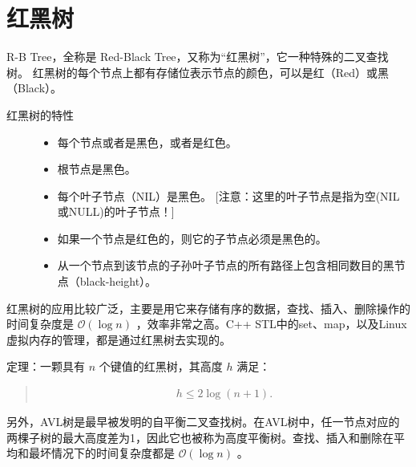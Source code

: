 \documentclass[letterpaper,10pt,english]{sphinxmanual}
\let\sphinxpxdimen\pdfpxdimen\else\newdimen\sphinxpxdimen
\begin{document}
\section{红黑树}
\label{\detokenize{mathematicsAlgorithm/02_redblackTree::doc}}\label{\detokenize{mathematicsAlgorithm/02_redblackTree:id1}}
R-B Tree，全称是 Red-Black Tree，又称为“红黑树”，它一种特殊的二叉查找树。
红黑树的每个节点上都有存储位表示节点的颜色，可以是红（Red）或黑（Black）。
\begin{description}
\item[{红黑树的特性}] \leavevmode\begin{itemize}
\item {} 
每个节点或者是黑色，或者是红色。

\item {} 
根节点是黑色。

\item {} 
每个叶子节点（NIL）是黑色。 {[}注意：这里的叶子节点是指为空(NIL或NULL)的叶子节点！{]}

\item {} 
如果一个节点是红色的，则它的子节点必须是黑色的。

\item {} 
从一个节点到该节点的子孙叶子节点的所有路径上包含相同数目的黑节点（black-height）。

\end{itemize}

\end{description}

\noindent{\hspace*{\fill}\sphinxincludegraphics[width=700\sphinxpxdimen]{{02_rbTree}.jpg}\hspace*{\fill}}

红黑树的应用比较广泛，主要是用它来存储有序的数据，查找、插入、删除操作的时间复杂度是 \(\mathcal{O}(\log n)\) ，效率非常之高。C++ STL中的set、map，以及Linux虚拟内存的管理，都是通过红黑树去实现的。

定理：一颗具有 \(n\) 个键值的红黑树，其高度 \(h\) 满足：
\begin{quote}
\begin{equation*}
\begin{split}h \leqslant 2 \log (n+1).\end{split}
\end{equation*}\end{quote}

另外，AVL树是最早被发明的自平衡二叉查找树。在AVL树中，任一节点对应的两棵子树的最大高度差为1，因此它也被称为高度平衡树。查找、插入和删除在平均和最坏情况下的时间复杂度都是 \(\mathcal{O}(\log n)\) 。
\end{document}
